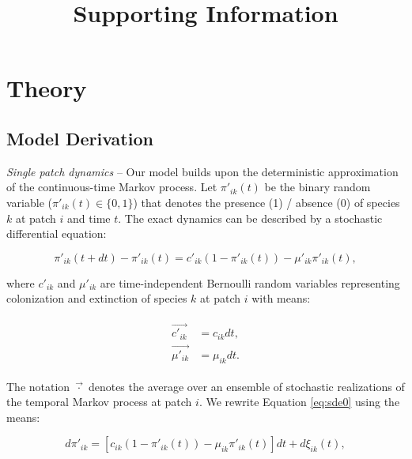 \documentclass[11pt, class=article, crop=false]{standalone}
\title{Supporting Information}
\date{} %
\begin{document}
\renewcommand{\theequation}{S\arabic{equation}}
\renewcommand{\thetable}{S\arabic{table}}
\renewcommand{\thefigure}{S\arabic{figure}}

\maketitle

\tableofcontents

\newpage

\section{Theory}

\subsection{Model Derivation}

\textit{Single patch dynamics} --
Our model builds upon the deterministic approximation of the continuous-time Markov process.
Let $\pi'_{ik}(t)$ be the binary random variable ($\pi'_{ik}(t) \in \{0, 1\}$) that denotes the presence (1) / absence (0) of species $k$ at patch $i$ and time $t$.
The exact dynamics can be described by a stochastic differential equation:

\begin{equation}
    \pi'_{ik}(t + dt) - \pi'_{ik}(t) = c'_{ik} (1 - \pi'_{ik}(t)) - \mu'_{ik} \pi'_{ik}(t),
    \label{eq:sde0}
\end{equation}

where $c'_{ik}$ and $\mu'_{ik}$ are time-independent Bernoulli random variables representing colonization and extinction  of species $k$ at patch $i$ with means:

\begin{align}
    \begin{split}
        \overrightarrow{c'_{ik}} &= c_{ik} dt,\\
        \overrightarrow{\mu'_{ik}} &= \mu_{ik} dt.
    \end{split}
\end{align}

The notation $\overrightarrow{\cdot}$ denotes the average over an ensemble of stochastic realizations of the temporal Markov process at patch $i$.
We rewrite Equation \ref{eq:sde0} using the means:

\begin{equation}
    d \pi'_{ik} = [c_{ik} (1 - \pi'_{ik}(t)) - \mu_{ik} \pi'_{ik}(t)]dt + d\xi_{ik}(t),
    \label{eq:sde1}
\end{equation}
\end{document}
